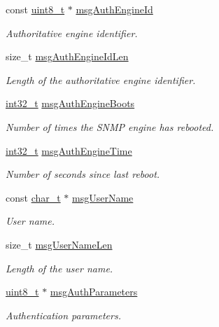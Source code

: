 \begin{DoxyCompactItemize}
const \hyperlink{stdint_8h_aba7bc1797add20fe3efdf37ced1182c5}{uint8\+\_\+t} $\ast$ \hyperlink{structSnmpMessage_a06ca20cfe6a8ffd06e259115fd417efb}{msg\+Auth\+Engine\+Id}
\begin{DoxyCompactList}\small\item\em Authoritative engine identifier. \end{DoxyCompactList}\item 
size\+\_\+t \hyperlink{structSnmpMessage_abe5c72a4c4f8a6c07667b0a8b6eae7ac}{msg\+Auth\+Engine\+Id\+Len}
\begin{DoxyCompactList}\small\item\em Length of the authoritative engine identifier. \end{DoxyCompactList}\item 
\hyperlink{stdint_8h_ab1967d8591af1a4e48c37fd2b0f184d0}{int32\+\_\+t} \hyperlink{structSnmpMessage_ac21a9a3e133f918bda8d8a9333609621}{msg\+Auth\+Engine\+Boots}
\begin{DoxyCompactList}\small\item\em Number of times the S\+N\+MP engine has rebooted. \end{DoxyCompactList}\item 
\hyperlink{stdint_8h_ab1967d8591af1a4e48c37fd2b0f184d0}{int32\+\_\+t} \hyperlink{structSnmpMessage_a3de807da8245c40a6de5365cf841ada7}{msg\+Auth\+Engine\+Time}
\begin{DoxyCompactList}\small\item\em Number of seconds since last reboot. \end{DoxyCompactList}\item 
const \hyperlink{compiler__port_8h_a40bb5262bf908c328fbcfbe5d29d0201}{char\+\_\+t} $\ast$ \hyperlink{structSnmpMessage_a83e0d7035f301d07352eb2d3b6b1679a}{msg\+User\+Name}
\begin{DoxyCompactList}\small\item\em User name. \end{DoxyCompactList}\item 
size\+\_\+t \hyperlink{structSnmpMessage_ac9a168d33bda6c99336def2b01440b3b}{msg\+User\+Name\+Len}
\begin{DoxyCompactList}\small\item\em Length of the user name. \end{DoxyCompactList}\item 
\hyperlink{stdint_8h_aba7bc1797add20fe3efdf37ced1182c5}{uint8\+\_\+t} $\ast$ \hyperlink{structSnmpMessage_ac458dda88c1471dabbd9ec5ca3f0f0fc}{msg\+Auth\+Parameters}
\begin{DoxyCompactList}\small\item\em Authentication parameters. \end{DoxyCompactList}\item 

\end{DoxyCompactItemize}
